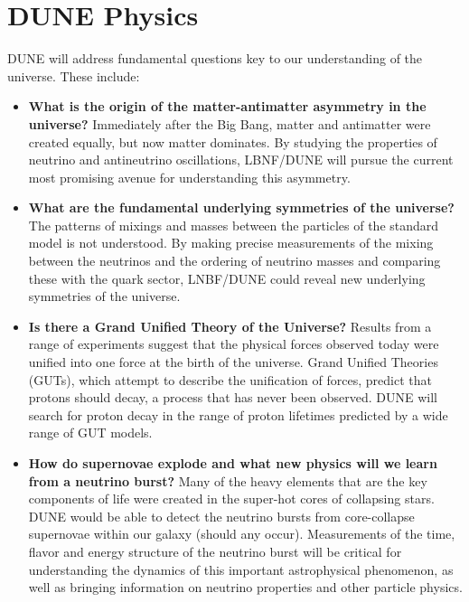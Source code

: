 \chapter{DUNE Physics}
\label{ch:exec-summ-physics}

DUNE will address fundamental questions key to our understanding of the universe. These include:
\begin{itemize}
   \item {\bf What is the origin of the matter-antimatter asymmetry in the universe?}
      Immediately after the Big Bang, matter and antimatter were created equally, but 
      now matter dominates.  By studying the properties of neutrino and antineutrino oscillations, 
      LBNF/DUNE will pursue the current most promising avenue for understanding this asymmetry.
   \item {\bf What are the fundamental underlying symmetries of the universe?} 
      The patterns of mixings and masses between the particles of the standard model 
      is not understood. By making precise measurements of the mixing between the neutrinos 
      and the ordering of neutrino masses and comparing these with the quark sector, 
      LNBF/DUNE could reveal new underlying symmetries of the universe.
  \item{\bf  Is there a Grand Unified Theory of the Universe?} 
      Results from a range of experiments suggest that the physical forces observed today 
      were unified into one force at the birth of the universe.  Grand Unified Theories (GUTs), 
      which attempt to describe the unification of forces, predict that protons should decay, 
      a process that has never been observed. DUNE will search for proton decay in the range of 
      proton lifetimes predicted by a wide range of GUT models.
   \item{\bf How do supernovae explode and what new physics will we learn from a neutrino burst?}
      Many of the heavy elements that are the key components of life were created in the 
      super-hot cores of collapsing stars.  DUNE would be able to detect the neutrino bursts 
      from core-collapse supernovae within our galaxy (should any occur).  Measurements of the 
      time, flavor and energy structure of the neutrino burst will be critical for understanding 
      the dynamics of this important astrophysical phenomenon, as well as bringing information 
      on neutrino properties and other particle physics.
\end{itemize}

